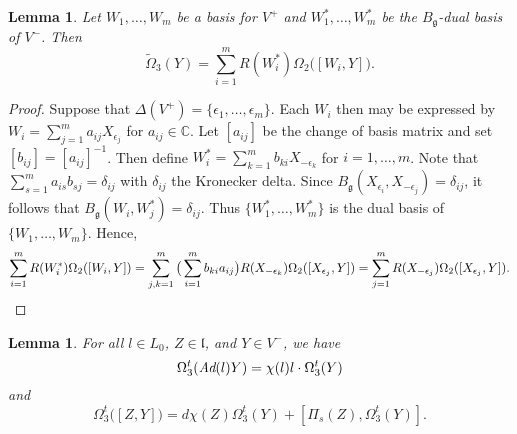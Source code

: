 \documentclass[11pt]{amsart}
\newtheorem{Lem}[equation]{Lemma}
\numberwithin{equation}{section}
\begin{document}
\begin{Lem}\label{Lem30}
Let $W_1, \ldots, W_m$ be a basis for $V^+$ and 
$W_1^*, \ldots, W_m^*$ be the $B_{{\mathfrak g}}$-dual basis of $V^-$.
Then
\begin{equation*}
\tilde{\Omega}_3(Y) = \sum_{i=1}^m R(W_i^*)\Omega_2\big( [W_i, Y] \big).
\end{equation*}
\end{Lem}

\begin{proof}
Suppose that ${\Delta}(V^+) = \{ {\epsilon}_1, \ldots, {\epsilon}_m\}$.
Each $W_i$ then may be expressed by 
$W_i = \sum_{j = 1}^m a_{ij}X_{{\epsilon}_j}$
for $a_{ij} \in {\mathbb{C}}$.
Let $[a_{ij}]$ be the change of basis matrix 
and set $[b_{ij}] = [a_{ij}]^{-1}$. 
Then define 
$W^*_i = \sum_{k=1}^mb_{ki}X_{-{\epsilon}_k}$
for $i=1,\ldots, m$. 
Note that $\sum_{s=1}^m a_{is}b_{sj} = {\delta}_{ij}$
with ${\delta}_{ij}$ the Kronecker delta.
Since $B_{{\mathfrak g}}(X_{{\epsilon}_i}, X_{-{\epsilon}_j}) = {\delta}_{ij}$,
it follows that 
$B_{{\mathfrak g}}(W_i, W_j^*) = {\delta}_{ij}$. 
Thus $\{W_1^*, \ldots, W_m^*\}$
is the dual basis of $\{W_1,\ldots, W_m\}$. 
Hence,
\begin{equation*}
\sum_{i=1}^m R(W_i^*)\Omega_2([W_i, Y])
=\sum_{j,k=1}^m\big( \sum_{i=1}^m b_{ki}a_{ij}\big)R(X_{-{\epsilon}_k})\Omega_2([X_{{\epsilon}_j},Y])\\
= \sum_{j=1}^m R(X_{-{\epsilon}_j})\Omega_2([X_{{\epsilon}_j}, Y]).
\end{equation*}
\end{proof}

\begin{Lem}\label{Lem31}
For all $l \in L_0$, $Z\in {{\mathfrak l}}$, and $Y \in V^-$, we have
\begin{equation*}\label{Eqn32}
\Omega^t_3(\emph{\text{Ad}}(l)Y) 
= \chi(l) l \cdot \Omega^t_3(Y)
\end{equation*} 
and
\begin{equation*}
\Omega^t_3\big([Z,Y]\big) 
=  d\chi(Z)\Omega^t_3(Y) + [\Pi_s(Z), \Omega^t_3(Y)].
\end{equation*}
\vskip 0.1in
\end{Lem}
\end{document}
